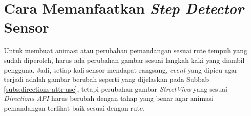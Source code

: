 
\section{Cara Memanfaatkan \textit{Step Detector} Sensor}
Untuk membuat animasi atau perubahan pemandangan sesuai rute tempuh yang sudah diperoleh, harus ada perubahan gambar sesuai langkah kaki yang diambil pengguna. Jadi, setiap kali sensor mendapat rangsang, \textit{event} yang dipicu agar terjadi adalah gambar berubah seperti yang dijelaskan pada Subbab \ref{subs:directions-attr-use}, tetapi perubahan gambar \textit{StreetView} yang sesuai \textit{Directions API} harus berubah dengan tahap yang benar agar animasi pemandangan terlihat baik sesuai dengan rute.